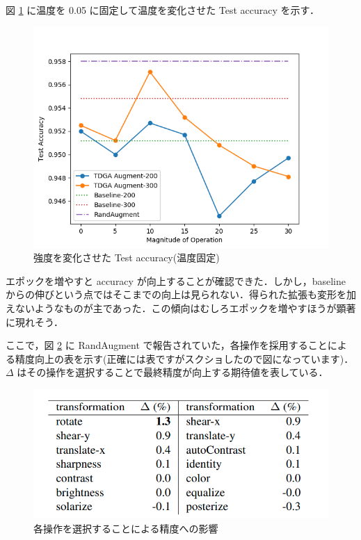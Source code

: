 \documentclass[onecolumn]{ujarticle}   %
\begin{document}
  図 \ref{fig:exp_change_mag} に温度を 0.05 に固定して温度を変化させた Test accuracy を示す．
  \begin{figure}[ht]
    \begin{center}
      \includegraphics[width=0.7\columnwidth]{exp_change_mag.png}
      \caption{強度を変化させた Test accuracy(温度固定)}
      \label{fig:exp_change_mag}
    \end{center}
  \end{figure}

  エポックを増やすと  accuracy が向上することが確認できた．しかし，baseline からの伸びという点ではそこまでの向上は見られない．得られた拡張も変形を加えないようなものが主であった．この傾向はむしろエポックを増やすほうが顕著に現れそう．

  ここで，図 \ref{fig:transform_importance} に RandAugment で報告されていた，各操作を採用することによる精度向上の表を示す(正確には表ですがスクショしたので図になっています)．$\Delta$ はその操作を選択することで最終精度が向上する期待値を表している．

  \begin{figure}[ht]
    \begin{center}
      \includegraphics[width=0.7\columnwidth]{operation_importance.png}
      \caption{各操作を選択することによる精度への影響}
      \label{fig:transform_importance}
    \end{center}
  \end{figure}
\end{document}
